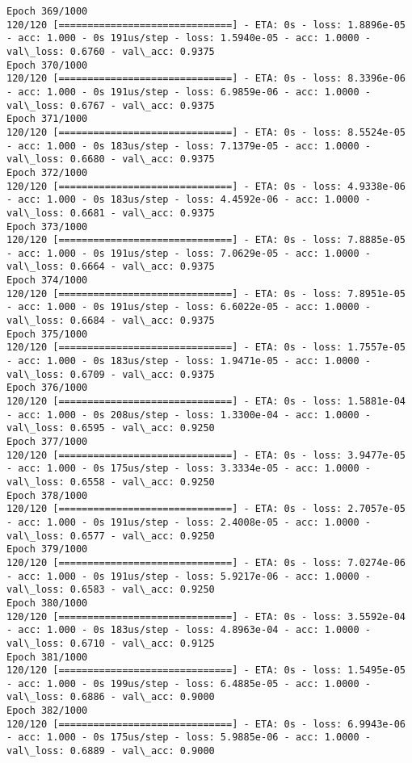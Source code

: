\documentclass[11pt]{article}
\begin{document}
\begin{Verbatim}[commandchars=\\\{\}]
Epoch 369/1000
120/120 [==============================] - ETA: 0s - loss: 1.8896e-05 - acc: 1.000 - 0s 191us/step - loss: 1.5940e-05 - acc: 1.0000 - val\_loss: 0.6760 - val\_acc: 0.9375
Epoch 370/1000
120/120 [==============================] - ETA: 0s - loss: 8.3396e-06 - acc: 1.000 - 0s 191us/step - loss: 6.9859e-06 - acc: 1.0000 - val\_loss: 0.6767 - val\_acc: 0.9375
Epoch 371/1000
120/120 [==============================] - ETA: 0s - loss: 8.5524e-05 - acc: 1.000 - 0s 183us/step - loss: 7.1379e-05 - acc: 1.0000 - val\_loss: 0.6680 - val\_acc: 0.9375
Epoch 372/1000
120/120 [==============================] - ETA: 0s - loss: 4.9338e-06 - acc: 1.000 - 0s 183us/step - loss: 4.4592e-06 - acc: 1.0000 - val\_loss: 0.6681 - val\_acc: 0.9375
Epoch 373/1000
120/120 [==============================] - ETA: 0s - loss: 7.8885e-05 - acc: 1.000 - 0s 191us/step - loss: 7.0629e-05 - acc: 1.0000 - val\_loss: 0.6664 - val\_acc: 0.9375
Epoch 374/1000
120/120 [==============================] - ETA: 0s - loss: 7.8951e-05 - acc: 1.000 - 0s 191us/step - loss: 6.6022e-05 - acc: 1.0000 - val\_loss: 0.6684 - val\_acc: 0.9375
Epoch 375/1000
120/120 [==============================] - ETA: 0s - loss: 1.7557e-05 - acc: 1.000 - 0s 183us/step - loss: 1.9471e-05 - acc: 1.0000 - val\_loss: 0.6709 - val\_acc: 0.9375
Epoch 376/1000
120/120 [==============================] - ETA: 0s - loss: 1.5881e-04 - acc: 1.000 - 0s 208us/step - loss: 1.3300e-04 - acc: 1.0000 - val\_loss: 0.6595 - val\_acc: 0.9250
Epoch 377/1000
120/120 [==============================] - ETA: 0s - loss: 3.9477e-05 - acc: 1.000 - 0s 175us/step - loss: 3.3334e-05 - acc: 1.0000 - val\_loss: 0.6558 - val\_acc: 0.9250
Epoch 378/1000
120/120 [==============================] - ETA: 0s - loss: 2.7057e-05 - acc: 1.000 - 0s 191us/step - loss: 2.4008e-05 - acc: 1.0000 - val\_loss: 0.6577 - val\_acc: 0.9250
Epoch 379/1000
120/120 [==============================] - ETA: 0s - loss: 7.0274e-06 - acc: 1.000 - 0s 191us/step - loss: 5.9217e-06 - acc: 1.0000 - val\_loss: 0.6583 - val\_acc: 0.9250
Epoch 380/1000
120/120 [==============================] - ETA: 0s - loss: 3.5592e-04 - acc: 1.000 - 0s 183us/step - loss: 4.8963e-04 - acc: 1.0000 - val\_loss: 0.6710 - val\_acc: 0.9125
Epoch 381/1000
120/120 [==============================] - ETA: 0s - loss: 1.5495e-05 - acc: 1.000 - 0s 199us/step - loss: 6.4885e-05 - acc: 1.0000 - val\_loss: 0.6886 - val\_acc: 0.9000
Epoch 382/1000
120/120 [==============================] - ETA: 0s - loss: 6.9943e-06 - acc: 1.000 - 0s 175us/step - loss: 5.9885e-06 - acc: 1.0000 - val\_loss: 0.6889 - val\_acc: 0.9000

\end{Verbatim}
\end{document}
